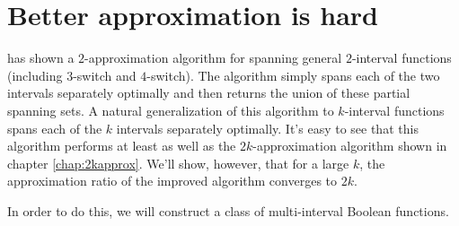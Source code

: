\chapter{Better approximation is hard}

\citeauthor{Dubovsky2012} has shown a $2$-approximation algorithm
for spanning general $2$-interval functions
(including $3$-switch and $4$-switch).\citep[p.~33]{Dubovsky2012}
The algorithm simply spans each of the two intervals
separately optimally and then returns the union
of these partial spanning sets.
A natural generalization of this algorithm to $k$-interval
functions spans each of the $k$ intervals separately
optimally.
It's easy to see that this algorithm performs
at least as well as the $2k$-approximation algorithm
shown in chapter \ref{chap:2kapprox}.
We'll show, however,
that for a large $k$,
the approximation ratio of the improved algorithm
converges to $2k$.

In order to do this,
we will construct a class of  multi-interval
Boolean functions.

